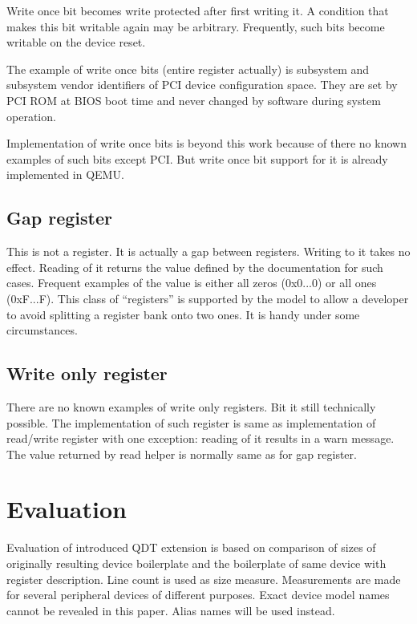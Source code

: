 \documentclass[conference,compsoc,a4paper]{IEEEtran}
\begin{document}
Write once bit becomes write protected after first writing it.
A condition that makes this bit writable again may be arbitrary.
Frequently, such bits become writable on the device reset.

The example of write once bits (entire register actually) is
subsystem and subsystem vendor identifiers of PCI device
configuration space.
They are set by PCI ROM at BIOS boot time and never changed by
software during system operation.

Implementation of write once bits is beyond this work because of
there no known examples of such bits except PCI.
But write once bit support for it is already implemented in QEMU.

\subsection{Gap register}

This is not a register.
It is actually a gap between registers.
Writing to it takes no effect.
Reading of it returns the value defined by the documentation for such
cases.
Frequent examples of the value is either all zeros (0x0...0) or all
ones (0xF...F).
This class of ``registers'' is supported by the model to allow a developer
to avoid splitting a register bank onto two ones.
It is handy under some circumstances.

\subsection{Write only register}

There are no known examples of write only registers.
Bit it still technically possible.
The implementation of such register is same as implementation of read/write
register with one exception: reading of it results in a warn message.
The value returned by read helper is normally same as for gap register.

\section{Evaluation}

Evaluation of introduced QDT extension is based on comparison of sizes of
originally resulting device boilerplate and the boilerplate of same device with
register description.
Line count is used as size measure.
Measurements are made for several peripheral devices of different
purposes.
Exact device model names cannot be revealed in this paper.
Alias names will be used instead.
\end{document}
